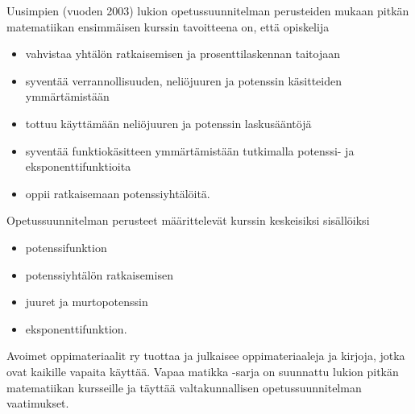 Uusimpien (vuoden 2003) lukion opetussuunnitelman perusteiden mukaan pitkän matematiikan ensimmäisen kurssin tavoitteena on, että opiskelija
\begin{itemize}
\item vahvistaa yhtälön ratkaisemisen ja prosenttilaskennan taitojaan
\item syventää verrannollisuuden, neliöjuuren ja potenssin käsitteiden ymmärtämistään
\item tottuu käyttämään neliöjuuren ja potenssin laskusääntöjä
\item syventää funktiokäsitteen ymmärtämistään tutkimalla potenssi- ja eksponenttifunktioita
\item oppii ratkaisemaan potenssiyhtälöitä.
\end{itemize}

Opetussuunnitelman perusteet määrittelevät kurssin keskeisiksi sisällöiksi
\begin{itemize}
\item potenssifunktion
\item potenssiyhtälön ratkaisemisen
\item juuret ja murtopotenssin
\item eksponenttifunktion.
\end{itemize}

Avoimet oppimateriaalit ry tuottaa ja julkaisee oppimateriaaleja ja kirjoja, jotka ovat kaikille vapaita käyttää. Vapaa matikka -sarja on suunnattu lukion pitkän matematiikan kursseille ja täyttää valtakunnallisen opetussuunnitelman vaatimukset.
